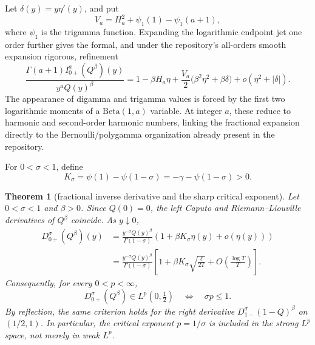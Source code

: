 \documentclass[11pt,oneside]{article}
\newtheorem{theorem}{Theorem}[section]
\theoremstyle{definition}
\theoremstyle{remark}
\newcommand{\Q}{Q}
\newcommand{\1}{\mathbf 1}
\begin{document}
\begin{remark}\label{p10:rem:Q-second-correction}
Let \(\delta(y)=y\eta'(y)\), and put
\begin{equation}\label{p10:eq:Va}
 V_a=H_a^2+\psi_1(1)-\psi_1(a+1),
\end{equation}
where \(\psi_1\) is the trigamma function.  Expanding the logarithmic endpoint jet one
order further gives the formal, and under the repository's all-orders smooth expansion
rigorous, refinement
\begin{equation}\label{p10:eq:Q-second-correction}
 \frac{\Gamma(a+1)I_{0+}^{a}(\Q^\beta)(y)}{y^a\Q(y)^\beta}
 =1-\beta H_a\eta
 +\frac{V_a}{2}\bigl(\beta^2\eta^2+\beta\delta\bigr)
 +o(\eta^2+|\delta|).
\end{equation}
The appearance of digamma and trigamma values is forced by the first two logarithmic
moments of a \(\mathrm{Beta}(1,a)\) variable.  At integer \(a\), these reduce to
harmonic and second-order harmonic numbers, linking the fractional expansion directly
to the Bernoulli/polygamma organization already present in the repository.
\end{remark}

For \(0<\sigma<1\), define
\begin{equation}\label{p10:eq:Ksigma}
 K_\sigma=\psi(1)-\psi(1-\sigma)
          =-\gamma-\psi(1-\sigma)>0.
\end{equation}

\begin{theorem}[fractional inverse derivative and the sharp critical exponent]
\label{p10:thm:Q-fractional-derivative-Lp}
Let \(0<\sigma<1\) and \(\beta>0\).  Since \(\Q(0)=0\), the left Caputo and
Riemann--Liouville derivatives of \(\Q^\beta\) coincide.  As \(y\downarrow0\),
\begin{align}
 D_{0+}^{\sigma}(\Q^\beta)(y)
 &=\frac{y^{-\sigma}\Q(y)^\beta}{\Gamma(1-\sigma)}
   \left(1+\beta K_\sigma\eta(y)+o(\eta(y))\right)
 \label{p10:eq:Q-frac-derivative-eta}\\
 &=\frac{y^{-\sigma}\Q(y)^\beta}{\Gamma(1-\sigma)}
   \left[
    1+\beta K_\sigma\sqrt{\frac{\ell}{2T}}
    +O\!\left(\frac{\log T}{T}\right)
   \right].
 \label{p10:eq:Q-frac-derivative-explicit}
\end{align}
Consequently, for every \(0<p<\infty\),
\begin{equation}\label{p10:eq:Q-frac-Lp-threshold}
 D_{0+}^{\sigma}(\Q^\beta)\in L^p(0,\tfrac12)
 \quad\Longleftrightarrow\quad \sigma p\le1.
\end{equation}
By reflection, the same criterion holds for the right derivative
\(D_{1-}^{\sigma}(1-\Q)^\beta\) on \((1/2,1)\).  In particular, the critical
exponent \(p=1/\sigma\) is included in the strong \(L^p\) space, not merely in weak
\(L^p\).
\end{theorem}
\end{document}
